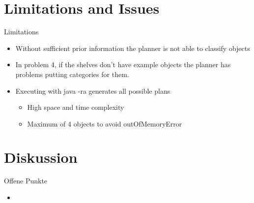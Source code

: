 \documentclass{beamer}
\begin{document}
\section{Limitations and Issues}

\begin{frame}{Limitations}
\begin{itemize}
	\item Without sufficient prior information the planner is not able to classify objects
	\item In problem 4, if the shelves don't have example objects  the planner has problems putting categories for them.
	\item Executing with java -ra generates all possible plans 
	\begin{itemize}
		\item High space and time complexity
		\item Maximum of 4 objects to avoid outOfMemoryError
	\end{itemize} 
\end{itemize}
\end{frame}


\section{Diskussion}

\begin{frame}{Offene Punkte}
\begin{itemize}

	\item 
\end{itemize}
\end{frame}




\begin{frame}{}

\end{frame}


%
\end{document}
